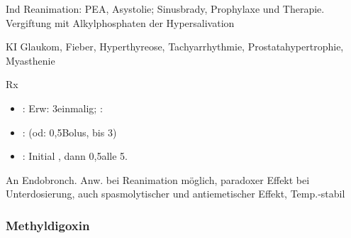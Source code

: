 \begin{labeling}[:]{mm}
  \item[Ind] Reanimation: PEA, Asystolie; Sinusbrady, Prophylaxe und Therapie.
  Vergiftung mit Alkylphosphaten der Hypersalivation
  \item[KI] Glaukom, Fieber, Hyperthyreose, Tachyarrhythmie,
  Prostatahypertrophie, Myasthenie
  \item[Rx] \begin{itemize}
    \item {}: Erw: 3\Mg* einmalig; :
    \item {}: \MgKg* (od:
    0,5\Mg* Bolus, bis 3\Mg*)
    \item {}: Initial \Mg, dann 0,5\Mg* alle
    5\Min*.
  \end{itemize}
  \item[An] Endobronch. Anw. bei Reanimation möglich, paradoxer Effekt bei
  Unterdosierung, auch spasmolytischer und antiemetischer Effekt, Temp.-stabil
\end{labeling}

\subsubsection{Methyldigoxin}

